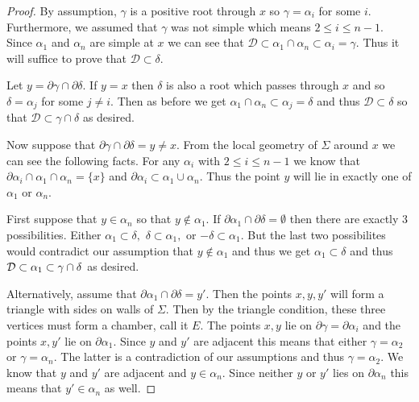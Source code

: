 \documentclass[class=book, crop=false,12 pt]{standalone}
\begin{document}
\begin{proof}
	By assumption, $\gamma$ is a positive root through $x$ so $\gamma=\alpha_i$ for some $i.$ Furthermore, we assumed that $\gamma$ was not simple which means $2\le i \le n-1.$ Since $\alpha_1$ and $\alpha_n$ are simple at $x$ we can see that $\mathcal{D}\subset \alpha_1\cap \alpha_n\subset \alpha_i=\gamma.$ Thus it will suffice to prove that $\mathcal{D}\subset \delta.$

	Let $y=\partial\gamma \cap \partial \delta.$ If $y=x$ then $\delta$ is also a root which passes through $x$ and so $\delta=\alpha_j$ for some $j\neq i.$ Then as before we get $\alpha_1\cap \alpha_n\subset \alpha_j=\delta$ and thus $\mathcal{D}\subset \delta$ so that $\mathcal{D}\subset \gamma\cap \delta$ as desired.

	Now suppose that $\partial \gamma\cap \partial \delta=y\neq x.$ From the local geometry of $\Sigma$ around $x$ we can see the following facts. For any $\alpha_i$ with $2\le i\le n-1$ we know that $\partial\alpha_i\cap \alpha_1\cap \alpha_n=\{x\}$ and $\partial\alpha_i\subset \alpha_1\cup\alpha_n.$ Thus the point $y$ will lie in exactly one of $\alpha_1$ or $\alpha_n.$

	First suppose that $y\in \alpha_n$ so that $y\not\in \alpha_1.$ If $\partial\alpha_1\cap \partial\delta=\emptyset$ then there are exactly 3 possibilities. Either $\alpha_1\subset \delta,$ $\delta\subset\alpha_1,$ or $-\delta\subset \alpha_1.$ But the last two possibilites would contradict our assumption that $y\not\in \alpha_1$ and thus we get $\alpha_1\subset \delta$ and thus $\mathcal{D}\subset \alpha_1\subset \gamma\cap\delta$ as desired.

	Alternatively, assume that $\partial\alpha_1\cap \partial\delta=y'.$ Then the points $x,y,y'$ will form a triangle with sides on walls of $\Sigma.$ Then by the triangle condition, these three vertices must form a chamber, call it $E.$ The points $x,y$ lie on $\partial\gamma=\partial\alpha_i$ and the points $x,y'$ lie on $\partial\alpha_1.$ Since $y$ and $y'$ are adjacent this means that either $\gamma=\alpha_2$ or $\gamma=\alpha_n.$ The latter is a contradiction of our assumptions and thus $\gamma=\alpha_2.$ We know that $y$ and $y'$ are adjacent and $y\in \alpha_n.$ Since neither $y$ or $y'$ lies on $\partial\alpha_n$ this means that $y'\in \alpha_n$ as well.


\end{proof}
\end{document}
